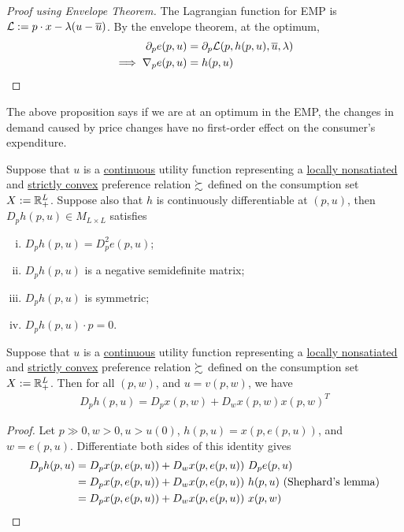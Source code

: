 \documentclass{report}
\begin{document}
 			\begin{proof}[Proof using Envelope Theorem]
 				The Lagrangian function for EMP is $\mathcal{{L}} := p \cdot x - \lambda (u - \overline{u})$. By the envelope theorem, at the optimum, 
 				\begin{align}
 					\partial_p e(p, u) &= \partial_p \mathcal{{L}}(p, h(p, u), \overline{u}, \lambda) \\
 					\implies \nabla_p e(p, u) &= h(p, u)
 				\end{align}
 			\end{proof}
 			
 			\begin{remark}[Interpretation]
 				The above proposition says if we are at an optimum in the EMP, the changes in demand caused by price changes have no first-order effect on the consumer's expenditure.
 			\end{remark}
 			
 			\begin{proposition}[3.G.2]
 				Suppose that $u$ is a \ul{continuous} utility function representing a \ul{locally nonsatiated} and \ul{strictly convex} preference relation $\succsim$ defined on the consumption set $X := \mathbb{R}^L_+$. Suppose also that $h$ is continuously differentiable at $(p, u)$, then $D_p h(p, u) \in M_{L \times L}$ satisfies
 				\begin{enumerate}[(i)]
 					\item $D_{p} h(p, u)=D_{p}^{2} e(p, u)$;
 					\item $D_p h(p, u)$ is a negative semidefinite matrix;
 					\item $D_p h(p, u)$ is symmetric;
 					\item $D_p h(p, u) \cdot p = 0$.
 				\end{enumerate}
 			\end{proposition}
 			
 			\begin{proposition}
 				Suppose that $u$ is a \ul{continuous} utility function representing a \ul{locally nonsatiated} and \ul{strictly convex} preference relation $\succsim$ defined on the consumption set $X := \mathbb{R}^L_+$. Then for all $(p, w)$, and $u=v(p, w)$, we have
 				\begin{align}
 					D_{p} h(p, u)=D_{p} x(p, w)+D_{w} x(p, w) x(p, w)^{T}
 				\end{align}
 			\end{proposition}
 			
 			\begin{proof}
 				Let $p \gg 0, w > 0, u > u(0)$, $h(p, u) = x(p, e(p, u))$, and $w = e(p, u)$. Differentiate both sides of this identity gives
 				\begin{align}
 					D_p h(p,u) &= D_p x(p, e(p,u)) + D_w x(p, e(p,u))\ D_p e(p, u) \\
 					&= D_p x(p, e(p,u)) + D_w x(p, e(p,u))\ h(p, u) \text{{ (Shephard's lemma)}} \\
 					&= D_p x(p, e(p,u)) + D_w x(p, e(p,u))\ x(p, w)
 				\end{align}
 			\end{proof}
 			
\end{document}
